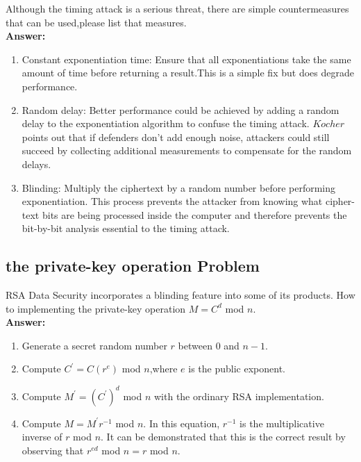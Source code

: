 \documentclass[paper=a4, fontsize=11pt]{scrartcl} %
\numberwithin{equation}{section} %
\numberwithin{figure}{section} %
\numberwithin{table}{section} %
\begin{document}
 Although the timing attack is a serious threat, there are simple countermeasures that can be used,please list that measures.\\

 \textbf{Answer:}

 \begin{enumerate}
 \item Constant exponentiation time: Ensure that all exponentiations take the same amount of time before returning a result.This is a simple fix but does degrade performance.
 \item Random delay: Better performance could be achieved by adding a random delay to the exponentiation algorithm to confuse the timing attack. $Kocher$ points out that if defenders don't add enough noise, attackers could still succeed by collecting additional measurements to compensate for the random delays.
 \item Blinding: Multiply the ciphertext by a random number before performing exponentiation. This process prevents the attacker from knowing what cipher-text bits are being processed inside the computer and therefore prevents the bit-by-bit analysis essential to the timing attack.
 \end{enumerate}


 \subsection{the private-key operation Problem \uppercase\expandafter{}}

 RSA Data Security incorporates a blinding feature into some of its products. How to implementing the private-key operation $M = C^{d}$ mod $n$.\\

 \textbf{Answer:}

 \begin{enumerate}
 \item Generate a secret random number $r$ between $0$ and $n - 1$.
 \item Compute $C^{'}= C(r^{e} )$ mod $n$,where $e$ is the public exponent.
 \item Compute $M^{'} = (C^{'})^{d}$ mod $n$ with the ordinary RSA implementation.
 \item Compute $M = M^{'} r^{-1}$ mod $n$. In this equation, $r^{-1}$ is the multiplicative inverse of $r$ mod $n$. It can be demonstrated that this is the correct result by observing that $r^{ed}$ mod $n = r$ mod $n$.
 \end{enumerate}
\end{document}
